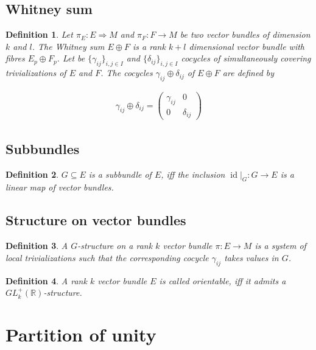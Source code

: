 \documentclass{scrartcl}
\newcommand{\R}{\mathbb R}
\newtheorem*{mydef}{Definition}
\begin{document}
\subsection{Whitney sum}

\begin{mydef}
  Let $\pi_E:E\Rightarrow M$ and $\pi_F : F \rightarrow M$ be two vector bundles of dimension $k$ and $l$. The \emph{Whitney sum} $E \oplus F$ is a rank $k+l$ dimensional vector bundle with fibres $E_p \oplus F_p$. Let be $\{\gamma_{ij}\}_{i,j\in I}$ and $\{\delta_{ij}\}_{i,j\in I}$ cocycles of simultaneously covering trivializations of $E$ and $F$. The cocycles $\gamma_{ij} \oplus \delta_{ij}$ of $E\oplus F$ are defined by

  \begin{align}
    \gamma_{ij}\oplus\delta_{ij} = \left(\begin{matrix}\gamma_{ij} & 0 \\ 0 & \delta_{ij}\end{matrix}\right)
  \end{align}
\end{mydef}

\subsection{Subbundles}

\begin{mydef}
  $G\subseteq E$ is a subbundle of $E$, iff the inclusion $\operatorname{id}|_G:G\rightarrow E$ is a linear map of vector bundles.
\end{mydef}

\subsection{Structure on vector bundles}

\begin{mydef}
  A \emph{$G$-structure} on a rank $k$ vector bundle $\pi:E\rightarrow M$ is a system of local trivializations such that the corresponding cocycle $\gamma_{ij}$ takes values in $G$.
\end{mydef}

\begin{mydef}
  A rank $k$ vector bundle $E$ is called \emph{orientable}, iff it admits a $GL_k^{+}(\R)$-structure.
\end{mydef}

\section{Partition of unity}
\end{document}
